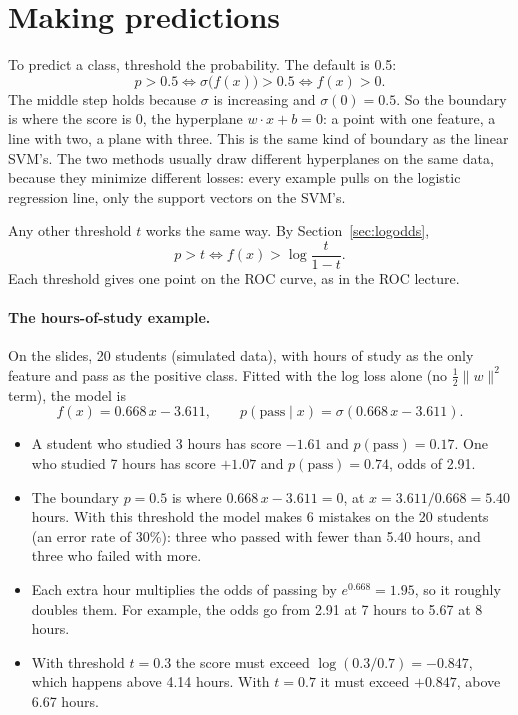 \documentclass[11pt]{article}
\begin{document}
\section{Making predictions}\label{sec:predict}

To predict a class, threshold the probability. The default is 0.5:
\[
  p > 0.5 \iff \sigma\bigl(f(x)\bigr) > 0.5 \iff f(x) > 0 .
\]
The middle step holds because $\sigma$ is increasing and $\sigma(0) = 0.5$. So the boundary is where
the score is 0, the hyperplane $w \cdot x + b = 0$: a point with one feature, a line with two, a plane
with three. This is the same kind of boundary as the linear SVM's. The two methods usually draw
different hyperplanes on the same data, because they minimize different losses: every example pulls
on the logistic regression line, only the support vectors on the SVM's.

Any other threshold $t$ works the same way. By Section~\ref{sec:logodds},
\[
  p > t \iff f(x) > \log\frac{t}{1 - t} .
\]
Each threshold gives one point on the ROC curve, as in the ROC lecture.

\paragraph{The hours-of-study example.} On the slides, 20 students (simulated data), with hours of
study as the only feature and pass as the positive class. Fitted with the log loss alone (no
$\tfrac12\|w\|^2$ term), the model is
\[
  f(x) = 0.668\, x - 3.611, \qquad p(\text{pass} \mid x) = \sigma(0.668\, x - 3.611).
\]
\begin{itemize}
  \item A student who studied 3 hours has score $-1.61$ and $p(\text{pass}) = 0.17$. One who studied
        7 hours has score $+1.07$ and $p(\text{pass}) = 0.74$, odds of 2.91.
  \item The boundary $p = 0.5$ is where $0.668\, x - 3.611 = 0$, at $x = 3.611 / 0.668 = 5.40$ hours.
        With this threshold the model makes 6 mistakes on the 20 students (an error rate of 30\%):
        three who passed with fewer than 5.40 hours, and three who failed with more.
  \item Each extra hour multiplies the odds of passing by $e^{0.668} = 1.95$, so it roughly doubles
        them. For example, the odds go from 2.91 at 7 hours to 5.67 at 8 hours.
  \item With threshold $t = 0.3$ the score must exceed $\log(0.3/0.7) = -0.847$, which happens above
        4.14 hours. With $t = 0.7$ it must exceed $+0.847$, above 6.67 hours.
\end{itemize}
\end{document}
